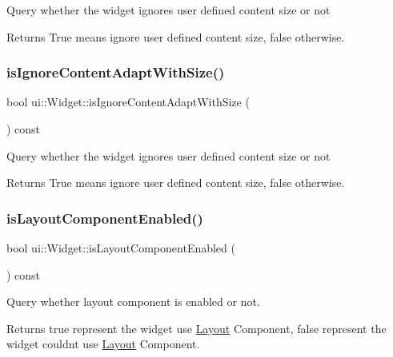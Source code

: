 Query whether the widget ignores user defined content size or not

\begin{DoxyReturn}{Returns}
True means ignore user defined content size, false otherwise. 
\end{DoxyReturn}
\mbox{\label{classui_1_1Widget_a6d0624feb9ef5cfbafdb71b80473390a}} 
\subsubsection{\texorpdfstring{is\+Ignore\+Content\+Adapt\+With\+Size()}{isIgnoreContentAdaptWithSize()}\hspace{0.1cm}{\footnotesize\ttfamily [2/2]}}
{\footnotesize\ttfamily bool ui\+::\+Widget\+::is\+Ignore\+Content\+Adapt\+With\+Size (\begin{DoxyParamCaption}{ }\end{DoxyParamCaption}) const}

Query whether the widget ignores user defined content size or not

\begin{DoxyReturn}{Returns}
True means ignore user defined content size, false otherwise. 
\end{DoxyReturn}
\mbox{\label{classui_1_1Widget_ab7dd215ebc30a43a24f441063bbc3fea}} 
\subsubsection{\texorpdfstring{is\+Layout\+Component\+Enabled()}{isLayoutComponentEnabled()}\hspace{0.1cm}{\footnotesize\ttfamily [1/2]}}
{\footnotesize\ttfamily bool ui\+::\+Widget\+::is\+Layout\+Component\+Enabled (\begin{DoxyParamCaption}{ }\end{DoxyParamCaption}) const}

Query whether layout component is enabled or not. \begin{DoxyReturn}{Returns}
true represent the widget use \hyperlink{classui_1_1Layout}{Layout} Component, false represent the widget couldn\textquotesingle{}t use \hyperlink{classui_1_1Layout}{Layout} Component. 
\end{DoxyReturn}
\mbox{\label{classui_1_1Widget_ab7dd215ebc30a43a24f441063bbc3fea}} 
